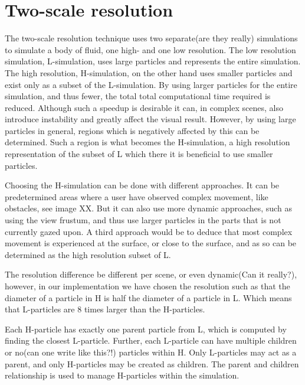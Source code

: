 \documentclass[../../main.tex]{subfiles}
\begin{document}
    


\section{Two-scale resolution}
The two-scale resolution technique uses two separate(are they really) simulations to simulate a body of fluid, one high- and one low resolution. The low resolution simulation, L-simulation, uses large particles and represents the entire simulation. The high resolution, H-simulation, on the other hand uses smaller particles and exist only as a subset of the L-simulation. By using larger particles for the entire simulation, and thus fewer, the total total computational time required is reduced. Although such a speedup is desirable it can, in complex scenes, also introduce instability and greatly affect the visual result. However, by using large particles in general, regions which is negatively affected by this can be determined. Such a region is what becomes the H-simulation, a high resolution representation of the subset of L which there it is beneficial to use smaller particles. 

Choosing the H-simulation can be done with different approaches. It can be predetermined areas where a user have observed complex movement, like obstacles, see image XX. But it can also use more dynamic approaches, such as using the view frustum, and thus use larger particles in the parts that is not currently gazed upon. A third approach would be to deduce that most complex movement is experienced at the surface, or close to the surface, and as so can be determined as the high resolution subset of L.

The resolution difference be different per scene, or even dynamic(Can it really?), however, in our implementation we have chosen the resolution such as that the diameter of a particle in H is half the diameter of a particle in L. Which means that L-particles are 8 times larger than the H-particles.

Each H-particle has exactly one parent particle from L, which is computed by finding the closest L-particle. Further, each L-particle can have multiple children or no(can one write like this?!) particles within H. Only L-particles may act as a parent, and only H-particles may be created as children. The parent and children relationship is used to manage H-particles within the simulation.
\end{document}
